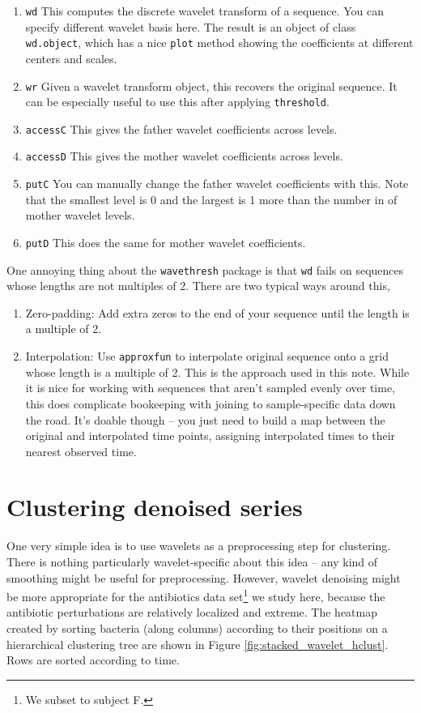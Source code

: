 \documentclass{article}
\begin{document}
\begin{enumerate}
  \item \texttt{wd} This computes the discrete wavelet transform of a sequence.
    You can specify different wavelet basis here. The result is an object of class
    \texttt{wd.object}, which has a nice \texttt{plot} method showing the
    coefficients at different centers and scales.
  \item \texttt{wr} Given a wavelet transform object, this recovers the original
    sequence. It can be especially useful to use this after applying \texttt{threshold}.
  \item \texttt{accessC} This gives the father wavelet coefficients across levels.
  \item \texttt{accessD} This gives the mother wavelet coefficients across levels.
  \item \texttt{putC} You can manually change the father wavelet coefficients
    with this. Note that the smallest level is 0 and the largest is 1 more than
    the number in of mother wavelet levels.
  \item \texttt{putD} This does the same for mother wavelet coefficients.
\end{enumerate}

One annoying thing about the \texttt{wavethresh} package is that \texttt{wd}
fails on sequences whose lengths are not multiples of 2. There are two typical
ways around this,

\begin{enumerate}
\item Zero-padding: Add extra zeros to the end of your sequence until the length
  is a multiple of 2.
\item Interpolation: Use \texttt{approxfun} to interpolate original sequence
  onto a grid whose length is a multiple of 2. This is the approach used in this
  note. While it is nice for working with sequences that aren't sampled evenly
  over time, this does complicate bookeeping with joining to sample-specific
  data down the road. It's doable though -- you just need to build a map between
  the original and interpolated time points, assigning interpolated times to
  their nearest observed time.
\end{enumerate}

\section{Clustering denoised series}

One very simple idea is to use wavelets as a preprocessing step for clustering.
There is nothing particularly wavelet-specific about this idea -- any kind of
smoothing might be useful for preprocessing. However, wavelet denoising might be
more appropriate for the antibiotics data set\footnote{We subset to subject F.}
we study here, because the antibiotic perturbations are relatively localized and
extreme. The heatmap created by sorting bacteria (along columns) according to
their positions on a hierarchical clustering tree are shown in Figure
\ref{fig:stacked_wavelet_hclust}. Rows are sorted according to time.
\end{document}
